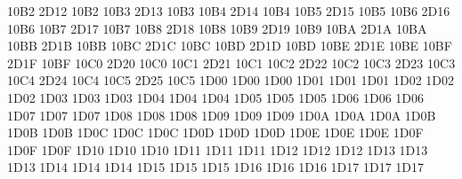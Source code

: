 \setcclcucx 10B2 2D12 10B2 %
\setcclcucx 10B3 2D13 10B3 %
\setcclcucx 10B4 2D14 10B4 %
\setcclcucx 10B5 2D15 10B5 %
\setcclcucx 10B6 2D16 10B6 %
\setcclcucx 10B7 2D17 10B7 %
\setcclcucx 10B8 2D18 10B8 %
\setcclcucx 10B9 2D19 10B9 %
\setcclcucx 10BA 2D1A 10BA %
\setcclcucx 10BB 2D1B 10BB %
\setcclcucx 10BC 2D1C 10BC %
\setcclcucx 10BD 2D1D 10BD %
\setcclcucx 10BE 2D1E 10BE %
\setcclcucx 10BF 2D1F 10BF %
\setcclcucx 10C0 2D20 10C0 %
\setcclcucx 10C1 2D21 10C1 %
\setcclcucx 10C2 2D22 10C2 %
\setcclcucx 10C3 2D23 10C3 %
\setcclcucx 10C4 2D24 10C4 %
\setcclcucx 10C5 2D25 10C5 %
\setcclcucx 1D00 1D00 1D00 %
\setcclcucx 1D01 1D01 1D01 %
\setcclcucx 1D02 1D02 1D02 %
\setcclcucx 1D03 1D03 1D03 %
\setcclcucx 1D04 1D04 1D04 %
\setcclcucx 1D05 1D05 1D05 %
\setcclcucx 1D06 1D06 1D06 %
\setcclcucx 1D07 1D07 1D07 %
\setcclcucx 1D08 1D08 1D08 %
\setcclcucx 1D09 1D09 1D09 %
\setcclcucx 1D0A 1D0A 1D0A %
\setcclcucx 1D0B 1D0B 1D0B %
\setcclcucx 1D0C 1D0C 1D0C %
\setcclcucx 1D0D 1D0D 1D0D %
\setcclcucx 1D0E 1D0E 1D0E %
\setcclcucx 1D0F 1D0F 1D0F %
\setcclcucx 1D10 1D10 1D10 %
\setcclcucx 1D11 1D11 1D11 %
\setcclcucx 1D12 1D12 1D12 %
\setcclcucx 1D13 1D13 1D13 %
\setcclcucx 1D14 1D14 1D14 %
\setcclcucx 1D15 1D15 1D15 %
\setcclcucx 1D16 1D16 1D16 %
\setcclcucx 1D17 1D17 1D17 %
